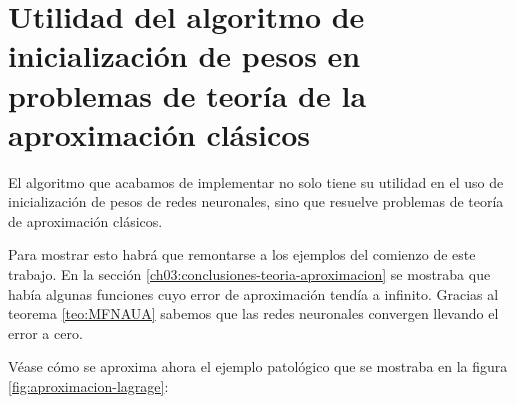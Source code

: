 
\section{Utilidad del algoritmo de inicialización de pesos en problemas de teoría de la aproximación clásicos}

El algoritmo que acabamos de implementar no solo 
tiene su utilidad en el uso de inicialización de pesos 
de redes neuronales, sino que resuelve problemas 
de teoría de aproximación clásicos. 

Para mostrar esto habrá que remontarse a los ejemplos
del comienzo de este trabajo.  
En la sección \ref{ch03:conclusiones-teoria-aproximacion}
se mostraba que había algunas funciones cuyo error
de aproximación  tendía a infinito.
Gracias al teorema \ref{teo:MFNAUA} sabemos que 
las redes neuronales convergen llevando el error 
a cero. 

Véase cómo se aproxima ahora el ejemplo patológico
que se mostraba en la figura \ref{fig:aproximacion-lagrage}: 


